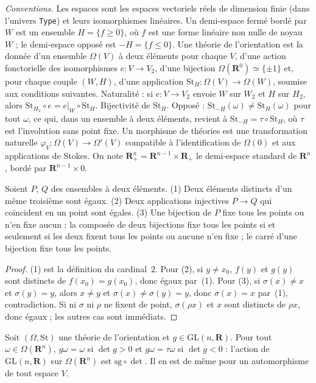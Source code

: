 \noindent\emph{Conventions.} Les espaces sont les espaces vectoriels réels de dimension finie (dans l'univers \texttt{Type}) et leurs isomorphismes linéaires. Un demi-espace fermé bordé par $W$ est un ensemble $H = \{f \geq 0\}$, où $f$ est une forme linéaire non nulle de noyau $W$ ; le demi-espace opposé est $-H = \{f \leq 0\}$. Une théorie de l'orientation est la donnée d'un ensemble $\Omega(V)$ à deux éléments pour chaque $V$, d'une action fonctorielle des isomorphismes $e : V \to V_2$, d'une bijection $\Omega(\mathbf R^0) \simeq \{\pm 1\}$ et, pour chaque couple $(W, H)$, d'une application $\mathrm{St}_H : \Omega(V) \to \Omega(W)$, soumise aux conditions suivantes. Naturalité : si $e : V \to V_2$ envoie $W$ sur $W_2$ et $H$ sur $H_2$, alors $\mathrm{St}_{H_2} \circ e = e|_W \circ \mathrm{St}_H$. Bijectivité de $\mathrm{St}_H$. Opposé : $\mathrm{St}_{-H}(\omega) \neq \mathrm{St}_H(\omega)$ pour tout $\omega$, ce qui, dans un ensemble à deux éléments, revient à $\mathrm{St}_{-H} = \tau \circ \mathrm{St}_H$, où $\tau$ est l'involution sans point fixe. Un morphisme de théories est une transformation naturelle $\varphi_V : \Omega(V) \to \Omega'(V)$ compatible à l'identification de $\Omega(0)$ et aux applications de Stokes. On note $\mathbf R^n_+ = \mathbf R^{n-1} \times \mathbf R_+$ le demi-espace standard de $\mathbf R^n$, bordé par $\mathbf R^{n-1} \times 0$.

\begin{lemme}\label{lem:68-deux}
Soient $P$, $Q$ des ensembles à deux éléments. (1) Deux éléments distincts d'un même troisième sont égaux. (2) Deux applications injectives $P \to Q$ qui coïncident en un point sont égales. (3) Une bijection de $P$ fixe tous les points ou n'en fixe aucun ; la composée de deux bijections fixe tous les points si et seulement si les deux fixent tous les points ou aucune n'en fixe ; le carré d'une bijection fixe tous les points.
\end{lemme}

\begin{proof}
(1) est la définition du cardinal~$2$. Pour (2), si $y \neq x_0$, $f(y)$ et $g(y)$ sont distincts de $f(x_0) = g(x_0)$, donc égaux par~(1). Pour (3), si $\sigma(x) \neq x$ et $\sigma(y) = y$, alors $x \neq y$ et $\sigma(x) \neq \sigma(y) = y$, donc $\sigma(x) = x$ par~(1), contradiction. Si ni $\sigma$ ni $\rho$ ne fixent de point, $\sigma(\rho x)$ et $x$ sont distincts de $\rho x$, donc égaux ; les autres cas sont immédiats.
\end{proof}

\begin{enonce}
Soit $(\Omega, \mathrm{St})$ une théorie de l'orientation et $g \in \mathrm{GL}(n, \mathbf R)$. Pour tout $\omega \in \Omega(\mathbf R^n)$, $g\omega = \omega$ si $\det g > 0$ et $g\omega = \tau\omega$ si $\det g < 0$ : l'action de $\mathrm{GL}(n, \mathbf R)$ sur $\Omega(\mathbf R^n)$ est $\mathrm{sg} \circ \det$. Il en est de même pour un automorphisme de tout espace $V$.
\end{enonce}

